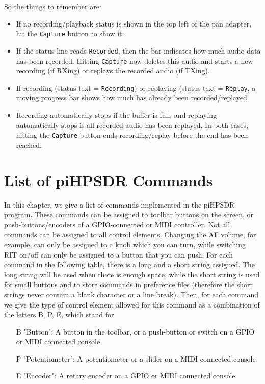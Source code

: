 \documentclass[12pt]{book}
\def\rett#1{\texttt{\color{red}#1}}
\def\bltt#1{\texttt{\color{blue}#1}}
\def\pH{pi\-HPSDR\xspace}
\begin{document}
So the things to remember are:
\begin{itemize}
\item{If no recording/playback status is shown in the top left of the pan adapter, hit the  \bltt{Capture} button
to show it.}
\item{If the status line reads \rett{Recorded}, then the bar indicates how much audio data has been recorded. Hitting
\bltt{Capture} now deletes this audio and starts a new recording (if RXing) or replays the recorded audio
(if TXing).}
\item{If recording (status text = \rett{Recording}) or replaying (status text = \rett{Replay}, a moving progress
bar shows how much has already been recorded/replayed.}
\item{Recording automatically stops if the buffer is full, and replaying automatically stops is all recorded audio
has been replayed. In both cases, hitting the \bltt{Capture} button ends recording/replay before the end has been reached.}
\end{itemize}


\appendix
\chapter{List of \pH Commands}
\label{sec:commandlist}

In this chapter, we give a list of commands implemented in the \pH program. These commands can be
assigned to toolbar buttons on the screen, or push-buttons/encoders of a GPIO-connected or MIDI controller.
Not all commands can be assigned to all control elements. Changing the AF volume, for example, can only be
assigned to a knob
which you can turn, while switching RIT on/off can only be assigned to a button that you can push. For each
command in the following table, there is a long and a short string assigned. The long string will be used
when there is enough space, while the short string is used for small buttons and to store commands in
preference files (therefore the short strings never contain a blank character or a line break). Then, for
each command we give the type of control element allowed for this command as a combination of the letters B,
P, E, which stand for

\begin{itemize}[font=\texttt, left=0pt]
\item[B] {"Button": A button in the toolbar, or a push-button or switch on a GPIO or MIDI connected console}
\item[P] {"Potentiometer": A potentiometer or a slider on a MIDI connected console}
\item[E] {"Encoder": A rotary encoder on a GPIO or MIDI connected console}
\end{itemize}
\end{document}
